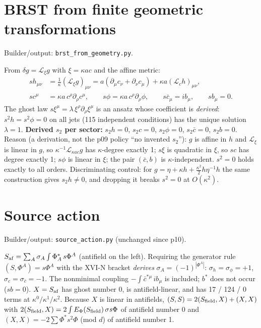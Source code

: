 \section{BRST from finite geometric transformations}
\noindent Builder/output: \texttt{brst\_from\_geometry.py}.\par\smallskip
From $\delta g=\mathcal L_\xi g$ with $\xi=\kappa a c$ and the affine metric:
\begin{align*}
s h_{\mu\nu}&=\tfrac1\kappa(\mathcal L_\xi g)_{\mu\nu}=a(\partial_\mu c_\nu+\partial_\nu c_\mu)+\kappa a(\mathcal L_ch)_{\mu\nu},\\
s c^\mu&=\kappa a\,c^\rho\partial_\rho c^\mu,\qquad s\phi=\kappa a\,c^\rho\partial_\rho\phi,\qquad
s\bar c_\mu=i b_\mu,\qquad s b_\mu=0 .
\end{align*}
The ghost law $s\xi^\mu=\lambda\,\xi^\rho\partial_\rho\xi^\mu$ is an ansatz whose coefficient is \emph{derived}:
$s^2h=s^2\phi=0$ on all jets (115 independent conditions) has the unique solution $\lambda=1$.
\textbf{Derived $s_2$ per sector:} $s_2h=0$, $s_2c=0$, $s_2\phi=0$, $s_2\bar c=0$, $s_2b=0$.
Reason (a derivation, not the p09 policy ``no invented $s_2$''): $g$ is affine in $h$ and $\mathcal L_\xi$ is linear
in $g$, so $\kappa^{-1}\mathcal L_{\kappa ac}g$ has $\kappa$-degree exactly 1; $s\xi$ is quadratic in $\xi$, so
$sc$ has degree exactly 1; $s\phi$ is linear in $\xi$; the pair $(\bar c,b)$ is $\kappa$-independent.
$s^2=0$ holds exactly to all orders. Discriminating control: for $g=\eta+\kappa h+\tfrac{\kappa^2}2h\eta^{-1}h$
the same construction gives $s_2h\neq0$, and dropping it breaks $s^2=0$ at $O(\kappa^2)$.

\section{Source action}
\noindent Builder/output: \texttt{source\_action.py} (unchanged since p10).\par\smallskip
$S_{\rm af}=\sum_A\sigma_A\int\Phi^*_A\,s\Phi^A$ (antifield on the left). Requiring the generator rule
$(S,\Phi^A)=s\Phi^A$ with the XVI-N bracket \emph{derives} $\sigma_A=(-1)^{|\Phi^A|}$:
$\sigma_h=\sigma_\phi=+1$, $\sigma_c=\sigma_{\bar c}=-1$. The nonminimal coupling $-\int\bar c^{*\mu}\,i b_\mu$ is
included; $b^*$ does not occur ($sb=0$). $X=S_{\rm af}$ has ghost number $0$, is antifield-linear, and has
17 / 124 / 0 terms at $\kappa^0/\kappa^1/\kappa^2$. Because $X$ is linear in antifields,
$(S,S)=2(S_{\rm field},X)+(X,X)$ with $2(S_{\rm field},X)=2\int E_\Phi(S_{\rm field})\,\sigma s\Phi$ of antifield
number 0 and $(X,X)=-2\sum\Phi^*s^2\Phi$ (mod $d$) of antifield number 1.

